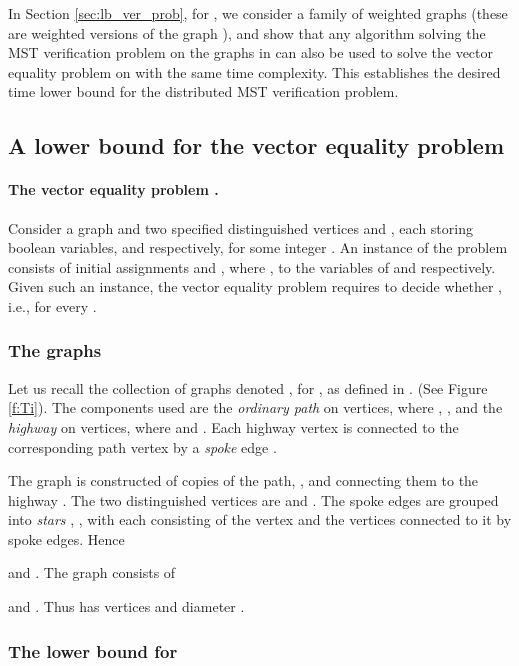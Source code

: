 \documentclass[11pt,letter]{article}
\begin{document}
In Section \ref{sec:lb_ver_prob}, for
, we consider a family  of weighted
graphs (these are weighted versions of the graph ), and show that any algorithm solving 
the MST verification problem on the graphs in  can also be used to 
solve the vector equality problem on  with the same time complexity.
This establishes the desired  time lower bound for the distributed MST verification problem.


\subsection{A lower bound for the vector equality problem}
\label{sec:VEprob}

\paragraph{The vector equality problem .}
Consider a graph  and two specified distinguished vertices  and , 
each storing  boolean variables, 
 and
 respectively,
for some integer . An instance of the problem 
consists of initial assignments
 and 
, 
where ,
to the variables of  and  respectively. Given such
an instance, the vector equality problem requires  to decide whether 
,  i.e.,  for every .  

\subsubsection{The graphs }
\label{ss:graphs}

Let us recall the collection of graphs denoted , for
, as defined in \cite{PR_00}. (See Figure \ref{f:Ti}). The components used 
are the {\em ordinary path}  on  vertices, where
, 
,
and the {\em highway}  on  vertices, where
 and
.
Each highway vertex  is connected to the corresponding 
path vertex  by a {\em spoke} edge . 

The graph  is constructed of  copies of the path, 
, and connecting them to the highway .
The two distinguished vertices are  and .
The spoke edges are grouped into  {\em stars} , , 
with each  consisting of the vertex  and the  vertices 
 connected to it by spoke edges. Hence

and .
The graph  consists of

and .
Thus  has  vertices and diameter .

\subsubsection{The lower bound for }
\label{subsec:ITN}
\end{document}

